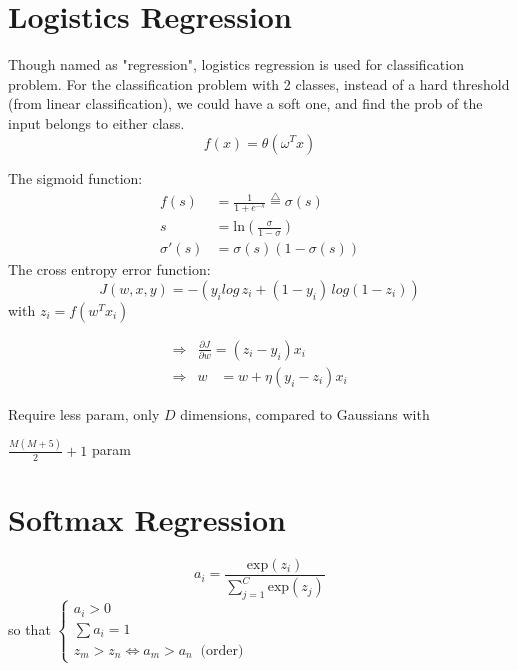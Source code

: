 \chapter{Logistics Regression}

Though named as "regression", logistics regression is used for classification problem. For the classification problem with 2 classes, instead of a hard threshold (from linear classification), we could have a soft one, and find the \ac{prob} of the input belongs to either class.
\begin{equation}
	f(x) = \theta(\omega^Tx)
\end{equation}

The sigmoid function:
\begin{align}
	f(s) 		&= \frac{1}{1 + e^{-s}} \overset{\triangle}{=} \sigma(s) \\
	s 			&= \text{ln} \left( \frac{\sigma}{1-\sigma} \right) \\
	\sigma'(s)	&= \sigma(s) \left( 1- \sigma(s) \right)
\end{align}
The cross entropy error function:
\begin{equation}
	J(w, x, y) = -\left( y_i log\,z_i + (1-y_i) \,log(1-z_i)  \right)
\end{equation}
with $z_i = f(w^T x_i)$

\begin{align}
	\Rightarrow &\frac{\partial J}{\partial w} = (z_i - y_i) x_i \\
	\Rightarrow &w \;\;\;= w + \eta (y_i - z_i) x_i
\end{align}

\note Require less \ac{param}, only $D$ dimensions, compared to Gaussians with

$\displaystyle \frac{M(M+5)}{2}+1$ \ac{param}

\chapter{Softmax Regression}


\begin{equation}
	a_i = \frac{\text{exp}(z_i)}{\sum_{j=1}^{C}\text{exp}(z_j)}
\end{equation}
so that $\begin{cases}
	a_i > 0 \\
	\sum a_i = 1 \\
	z_m > z_n \iff a_m > a_n \;\;\text{(order)}
\end{cases}$

